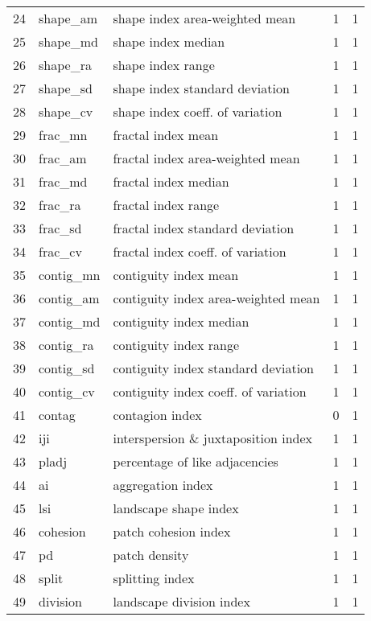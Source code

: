 \begin{longtable}{rllrr}
   24 & shape\_am & shape index area-weighted mean &   1 &   1 \\ 
   25 & shape\_md & shape index median &   1 &   1 \\ 
   26 & shape\_ra & shape index range &   1 &   1 \\ 
   27 & shape\_sd & shape index standard deviation &   1 &   1 \\ 
   28 & shape\_cv & shape index coeff. of variation &   1 &   1 \\ 
   29 & frac\_mn & fractal index mean &   1 &   1 \\ 
   30 & frac\_am & fractal index area-weighted mean &   1 &   1 \\ 
   31 & frac\_md & fractal index median &   1 &   1 \\ 
   32 & frac\_ra & fractal index range &   1 &   1 \\ 
   33 & frac\_sd & fractal index standard deviation &   1 &   1 \\ 
   34 & frac\_cv & fractal index coeff. of variation &   1 &   1 \\ 
   35 & contig\_mn & contiguity index mean &   1 &   1 \\ 
   36 & contig\_am & contiguity index area-weighted mean &   1 &   1 \\ 
   37 & contig\_md & contiguity index median &   1 &   1 \\ 
   38 & contig\_ra & contiguity index range &   1 &   1 \\ 
   39 & contig\_sd & contiguity index standard deviation &   1 &   1 \\ 
   40 & contig\_cv & contiguity index coeff. of variation &   1 &   1 \\ 
   41 & contag & contagion index &   0 &   1 \\ 
   42 & iji & interspersion \& juxtaposition index &   1 &   1 \\ 
   43 & pladj & percentage of like adjacencies &   1 &   1 \\ 
   44 & ai & aggregation index &   1 &   1 \\ 
   45 & lsi & landscape shape index &   1 &   1 \\ 
   46 & cohesion & patch cohesion index &   1 &   1 \\ 
   47 & pd & patch density &   1 &   1 \\ 
   48 & split & splitting index &   1 &   1 \\ 
   49 & division & landscape division index &   1 &   1 \\ 

\end{longtable}
